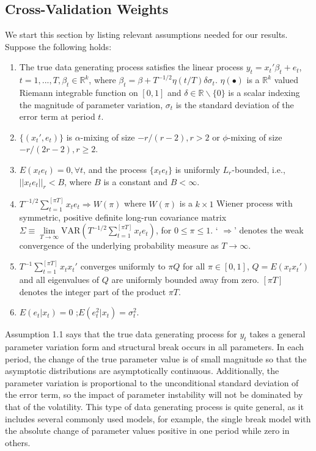 \subsection{Cross-Validation Weights}
We start this section by listing relevant assumptions needed for our results. Suppose the following holds:
\begin{assumption}\label{asump:1}
	\begin{enumerate}
		\item The true data generating process satisfies the linear process $y_t = x_t'\beta_t + e_t$, $t=1,...,T,\beta_t \in \mathbb{R}^k$, where $\beta_t = \beta + T^{-1/2}\eta(t/T)\delta\sigma_t$. $\eta(\bullet)$ is a $\mathbb{R}^k$ valued Riemann integrable function on $[0,1]$ and $\delta \in \mathbb{R}\backslash\{0\}$ is a scalar indexing the magnitude of parameter variation, $\sigma_{t}$ is the standard deviation of the error term at period $t$.
		\item $\{(x_t',e_t)\}$ is $\alpha$-mixing of size $-r/(r-2),r > 2$ or $\phi$-mixing of size $-r/(2r-2),r \geq 2$.
	    \item $E(x_t e_t) = 0, \forall t$, and the process $\{x_t e_t\}$ is uniformly $L_r$-bounded, i.e., $||x_t e_t||_{r} < B$, where $B$ is a constant and $B < \infty$.
	    \item $T^{-1/2}\sum_{t=1}^{[\pi T]} x_t e_t \Rightarrow W(\pi)$ where $W(\pi)$ is a $k \times 1$ Wiener process with symmetric, positive definite long-run covariance matrix $\Sigma \equiv \lim\limits_{T\to \infty}\mathrm{VAR}(T^{-1/2}\sum_{t=1}^{[\pi T]} x_t e_t)$, for $0 \leq \pi \leq 1$. ` $\Rightarrow$' denotes the weak convergence of the underlying probability measure as $T \to \infty$.
		\item $T^{-1}\sum_{t=1}^{[\pi T]}x_t x_t'$ converges uniformly to $\pi Q$ for all $\pi \in [0,1]$, $Q = E(x_t x_t')$ and all eigenvalues of $Q$ are uniformly bounded away from zero. $[\pi T]$ denotes the integer part of the product $\pi T$.
		\item $E(e_t|x_t) = 0$ ;$E(e_t^{2}|x_t) = \sigma_t^{2}$.
	\end{enumerate}
\end{assumption}
Assumption 1.1 says that the true data generating process for $y_t$ takes a general parameter variation form and structural break occurs in all parameters. In each period, the change of the true parameter value is of small magnitude so that the asymptotic distributions are asymptotically continuous. Additionally, the parameter variation is proportional to the unconditional standard deviation of the error term, so the impact of parameter instability will not be dominated by that of the volatility. This type of data generating process is quite general, as it includes several commonly used models, for example, the single break model with the absolute change of parameter values positive in one period while zero in others.

